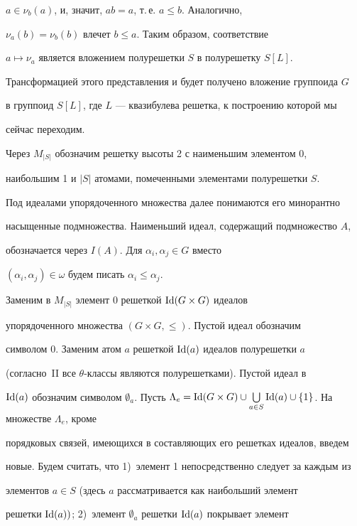 $a\in\nu_b(a)$, и, значит, $ab=a$, т.\,е. $a\leqslant b$. Аналогично,


$\nu_a(b)=\nu_b(b)$ влечет $b\leqslant a$. Таким образом, соответствие


$a\mapsto\nu_a$ является вложением полурешетки $S$ в полурешетку $S[L]$.





Трансформацией этого представления и будет получено вложение группоида $G$


в группоид $S[L]$, где $L$ --- квазибулева решетка, к построению которой мы


сейчас переходим.





Через $M_{|S|}$ обозначим решетку высоты 2 с наименьшим элементом 0,


наибольшим 1 и $|S|$ атомами, помеченными элементами полурешетки $S$.


Под идеалами упорядоченного множества далее понимаются его минорантно


насыщенные подмножества. Наименьший идеал, содержащий подмножество $A$,


обозначается через $I(A)$. Для $\alpha_i,\alpha_j\in G$ вместо


$(\alpha_i,\alpha_j)\in\omega$ будем писать $\alpha_i\leqslant\alpha_j$.





Заменим в $M_{|S|}$ элемент 0 решеткой $\operatorname{Id}(G\times G)$ идеалов


упорядоченного множества $(G\times G,\leqslant)$. Пустой идеал обозначим


символом 0. Заменим атом $a$ решеткой $\operatorname{Id}(a)$ идеалов полурешетки $a$


(согласно~II все $\theta$-классы являются полурешетками). Пустой идеал в


$\Id(a)$ обозначим символом $\emptyset_a$. Пусть $\Lambda_e=\Id(G\times


G)\cup\bigcup\limits_{a\in S}\Id(a)\cup\{1\}$. На множестве $\Lambda_e$, кроме


порядковых связей, имеющихся в составляющих его решетках идеалов, введем


новые. Будем считать, что 1)~элемент 1 непосредственно следует за каждым из


элементов $a\in S$ (здесь $a$ рассматривается как наибольший элемент


решетки $\operatorname{Id}(a))$; 2)~элемент $\emptyset_a$ решетки $\operatorname{Id}(a)$ покрывает элемент


